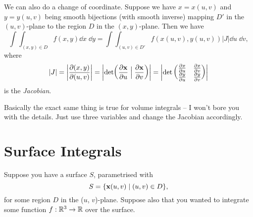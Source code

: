 \documentclass[11pt]{article}
\begin{document}
We can also do a change of coordinate. Suppose we have $x = x(u,v)$ and $y = y(u, v)$ being smooth bijections (with smooth inverse) mapping $D'$ in the $(u, v)$-plane to the region $D$ in the $(x, y)$-plane. Then we have
$$
\int \int_{(x, y) \in D} f(x, y) \dd x \; \dd y = \int \int_{(u, v) \in D'} f(x(u, v), y(u, v)) |J| \dd u \; \dd v,
$$
where
$$
	|J| = \left|\frac{\partial (x, y)}{\partial (u, v)}\right| = \biggl|\det\biggl(
		\frac{\partial \mathbf{x}}{\partial u} \mathrel{\Big|} \frac{\partial \mathbf{x}}{\partial v}
	  \biggr)\biggr|=\left|\det\begin{pmatrix}
		\frac{\partial x}{\partial u} & \frac{\partial x}{\partial v} \\
		\frac{\partial y}{\partial u} & \frac{\partial y}{\partial v}
		\end{pmatrix}\right|
$$
is the \emph{Jacobian}.

Basically the exact same thing is true for volume integrals -- I won't bore you with the details. Just use three variables and change the Jacobian accordingly.

\clearpage

\section{Surface Integrals}

Suppose you have a surface $S$, parametrised with
$$
S = \{\mathbf{x}(u, v) \mid (u, v) \in D\},
$$
for some region $D$ in the ($u$, $v$)-plane. Suppose also that you wanted to integrate some function $f: \mathbb{R}^3 \rightarrow \mathbb{R}$ over the surface.
\end{document}
